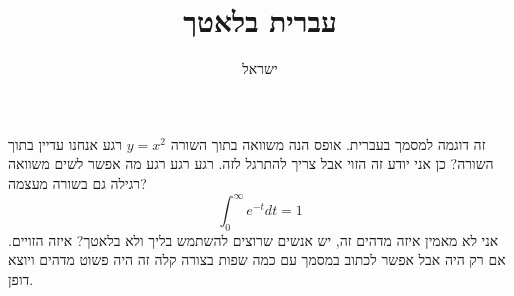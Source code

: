 \documentclass{article}
\begin{document}
\title{עברית בלאטך}
\author{ישראל}
\maketitle

זה דוגמה למסמך בעברית. אופס הנה משוואה בתוך השורה
$y=x^2$
רגע אנחנו עדיין בתוך השורה? כן אני יודע זה הזוי אבל צריך להתרגל לזה. רגע רגע רגע מה אפשר לשים משוואה רגילה גם בשורה מעצמה?
\[\int_0^{\infty} e^{-t} dt = 1\]
אני לא מאמין איזה מדהים זה, יש אנשים שרוצים להשתמש בליך ולא בלאטך? איזה הזויים. אם רק היה אבל אפשר לכתוב במסמך עם כמה שפות בצורה קלה זה היה פשוט מדהים ויוצא דופן.
\end{document}
